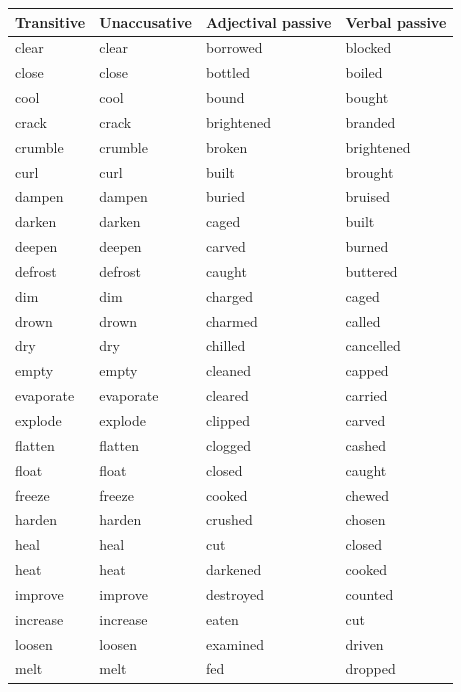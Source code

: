 \documentclass[output=paper]{langsci/langscibook}
\begin{document}
\begin{subappendices}
{\smaller
\begin{tabularx}{\textwidth}{XXXX}
{\bfseries Transitive}  & {\bfseries Unaccusative} & {\bfseries Adjectival passive} & {\bfseries Verbal passive}\\
\midrule
clear     & clear     & borrowed   & blocked\\
close     & close     & bottled    & boiled\\
cool      & cool      & bound      & bought\\
crack     & crack     & brightened & branded\\
crumble   & crumble   & broken     & brightened\\
curl      & curl      & built      & brought\\
dampen    & dampen    & buried     & bruised\\
darken    & darken    & caged      & built \\
deepen    & deepen    & carved     & burned\\
defrost   & defrost   & caught     & buttered\\
dim       & dim       & charged    & caged\\
drown     & drown     & charmed    & called\\
dry       & dry       & chilled    & cancelled \\
empty     & empty     & cleaned    & capped\\
evaporate & evaporate & cleared    & carried\\
explode   & explode   & clipped    & carved\\
flatten   & flatten   & clogged    & cashed\\
float     & float     & closed     & caught\\
freeze    & freeze    & cooked     & chewed\\
harden    & harden    & crushed    & chosen\\
heal      & heal      & cut        & closed\\
heat      & heat      & darkened   & cooked\\
improve   & improve   & destroyed  & counted\\
increase  & increase  & eaten      & cut\\
loosen    & loosen    & examined   & driven\\
melt      & melt      & fed        & dropped\\

\end{tabularx}}
\end{subappendices}
\end{document}
